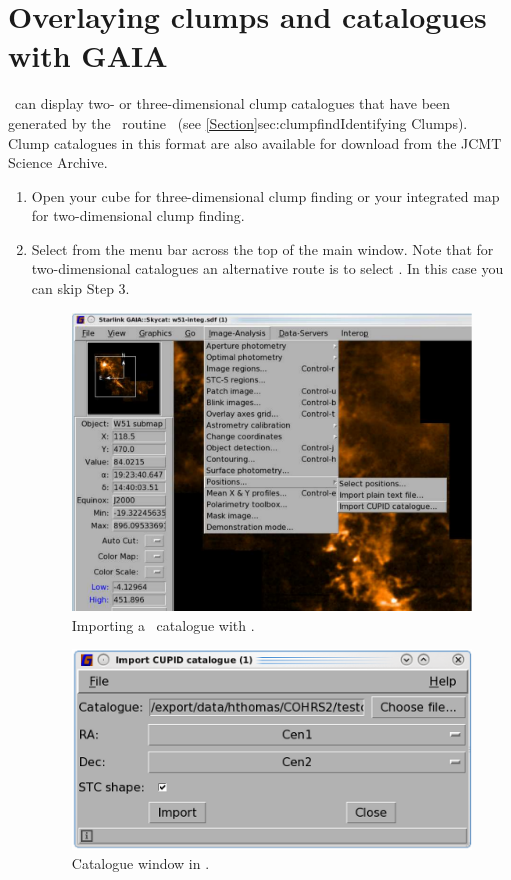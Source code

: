 \documentclass[11pt,oneside,chapters]{starlink}
\begin{document}
\section{Overlaying clumps and catalogues with GAIA}
\label{sec:plotclumps}

\gaia\ can display two- or three-dimensional clump catalogues that
have been generated by the \cupid\ routine \findclumps\ (see
\cref{Section}{sec:clumpfind}{Identifying Clumps}). Clump catalogues
in this format are also available for download from the JCMT Science
Archive.

\begin{enumerate}[label=(\textbf{\arabic*})]
\item Open your cube for three-dimensional clump finding or your
integrated map for two-dimensional clump finding.

\item Select  from the menu bar across the top of the main window. Note
that for two-dimensional catalogues an alternative route is to select
. In this case you can skip
Step 3.

\begin{figure}[h!]
\begin{center}
\includegraphics[width=0.5\linewidth]{sc20_plotclumps2b}
\caption[Importing a \cupid\ catalogue with \gaia.]{\label{fig:gaia_clumps1}
  Importing a \cupid\ catalogue with \gaia.}
\end{center}
\end{figure}

\begin{figure}[h!]
\begin{center}
\includegraphics[width=0.5\linewidth]{sc20_plotclumps3}
\caption[Catalogue window in \gaia.]{\label{fig:gaia_clumps2}
  Catalogue window in \gaia.}
\end{center}
\end{figure}


\end{enumerate}
\end{document}
